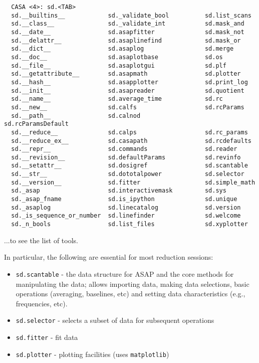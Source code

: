 \small
\begin{verbatim}
  CASA <4>: sd.<TAB>
  sd.__builtins__            sd._validate_bool          sd.list_scans
  sd.__class__               sd._validate_int           sd.mask_and
  sd.__date__                sd.asapfitter              sd.mask_not
  sd.__delattr__             sd.asaplinefind            sd.mask_or
  sd.__dict__                sd.asaplog                 sd.merge
  sd.__doc__                 sd.asaplotbase             sd.os
  sd.__file__                sd.asaplotgui              sd.plf
  sd.__getattribute__        sd.asapmath                sd.plotter
  sd.__hash__                sd.asapplotter             sd.print_log
  sd.__init__                sd.asapreader              sd.quotient
  sd.__name__                sd.average_time            sd.rc
  sd.__new__                 sd.calfs                   sd.rcParams
  sd.__path__                sd.calnod                  sd.rcParamsDefault
  sd.__reduce__              sd.calps                   sd.rc_params
  sd.__reduce_ex__           sd.casapath                sd.rcdefaults
  sd.__repr__                sd.commands                sd.reader
  sd.__revision__            sd.defaultParams           sd.revinfo
  sd.__setattr__             sd.dosigref                sd.scantable
  sd.__str__                 sd.dototalpower            sd.selector
  sd.__version__             sd.fitter                  sd.simple_math
  sd._asap                   sd.interactivemask         sd.sys
  sd._asap_fname             sd.is_ipython              sd.unique
  sd._asaplog                sd.linecatalog             sd.version
  sd._is_sequence_or_number  sd.linefinder              sd.welcome
  sd._n_bools                sd.list_files              sd.xyplotter
\end{verbatim}
\normalsize

...to see the list of tools.

In particular, the following are essential for most reduction
sessions: 
\begin{itemize}
   \item {\tt sd.scantable} - the data structure for ASAP and the core
         methods for manipulating the data; allows importing data,
         making data selections, basic operations (averaging,
         baselines, etc) and setting data characteristics (e.g.,
         frequencies, etc).
   \item {\tt sd.selector} - selects a subset of data for subsequent operations
   \item {\tt sd.fitter} - fit data 
   \item {\tt sd.plotter} - plotting facilities (uses {\tt matplotlib})
\end{itemize}

